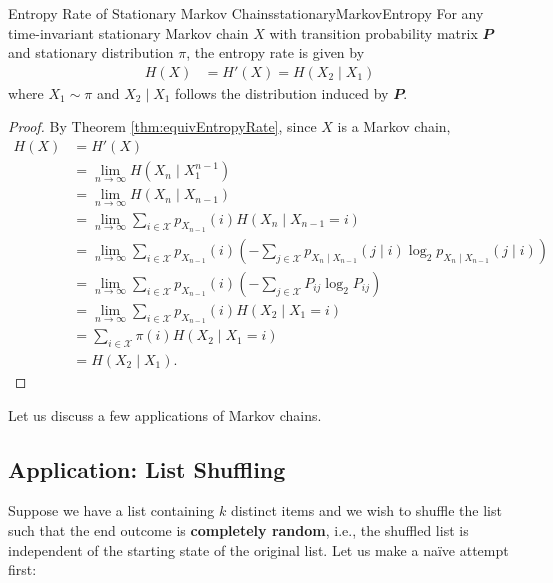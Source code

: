 \documentclass[math]{amznotes}
\theoremstyle{remark}
\begin{document}
\begin{probox}{Entropy Rate of Stationary Markov Chains}{stationaryMarkovEntropy}
    For any time-invariant stationary Markov chain $X$ with transition probability matrix $\mathbfit{P}$ and stationary distribution $\pi$, the entropy rate is given by 
    \begin{align*}
        H\left(X\right) & = H'\left(X\right) = H\left(X_2 \mid X_1\right)
    \end{align*}
    where $X_1 \sim \pi$ and $X_2 \mid X_1$ follows the distribution induced by $\mathbfit{P}$.
    \tcblower
    \begin{proof}
        By Theorem \ref{thm:equivEntropyRate}, since $X$ is a Markov chain,
        \begin{align*}
            H\left(X\right) & = H'\left(X\right) \\
            & = \lim_{n \to \infty}H\left(X_n \mid X_1^{n - 1}\right) \\
            & = \lim_{n \to \infty}H\left(X_n \mid X_{n - 1}\right) \\
            & = \lim_{n \to \infty}\sum_{i \in \mathcal{X}}p_{X_{n - 1}}\left(i\right)H\left(X_n \mid X_{n - 1} = i\right) \\
            & = \lim_{n \to \infty}\sum_{i \in \mathcal{X}}p_{X_{n - 1}}\left(i\right)\left(-\sum_{j \in \mathcal{X}}p_{X_n \mid X_{n - 1}}\left(j \mid i\right)\log_2p_{X_n \mid X_{n - 1}}\left(j \mid i\right)\right) \\
            & = \lim_{n \to \infty}\sum_{i \in \mathcal{X}}p_{X_{n - 1}}\left(i\right)\left(-\sum_{j \in \mathcal{X}}P_{ij}\log_2P_{ij}\right) \\
            & = \lim_{n \to \infty}\sum_{i \in \mathcal{X}}p_{X_{n - 1}}\left(i\right)H\left(X_2 \mid X_1 = i\right) \\
            & = \sum_{i \in \mathcal{X}}\pi\left(i\right)H\left(X_2 \mid X_1 = i\right) \\
            & = H\left(X_2 \mid X_1\right).
        \end{align*}
    \end{proof}
\end{probox}
Let us discuss a few applications of Markov chains.
\subsection{Application: List Shuffling}
Suppose we have a list containing $k$ distinct items and we wish to shuffle the list such that the end outcome is \textbf{completely random}, i.e., the shuffled list is independent of the starting state of the original list. Let us make a na\"{i}ve attempt first:
\end{document}
